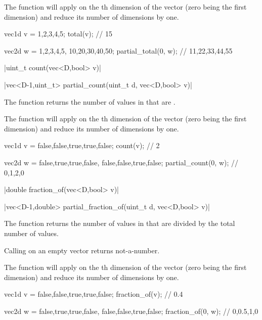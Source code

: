 The function  will apply  on the th dimension of the vector (zero being the first dimension) and reduce its number of dimensions by one.

\begin{example}
\begin{cppcode}
vec1d v = {1,2,3,4,5};
total(v); // 15

vec2d w = {{1,2,3,4,5}, {10,20,30,40,50}};
partial_total(0, w); // {11,22,33,44,55}
\end{cppcode}
\end{example}

\funcitem \cppinline|uint_t count(vec<D,bool> v)| 

\cppinline|vec<D-1,uint_t> partial_count(uint_t d, vec<D,bool> v)| 

The function  returns the number of values in  that are .

The function  will apply  on the th dimension of the vector (zero being the first dimension) and reduce its number of dimensions by one.

\begin{example}
\begin{cppcode}
vec1d v = {false,false,true,true,false};
count(v); // 2

vec2d w = {{false,true,true,false}, {false,false,true,false}};
partial_count(0, w); // {0,1,2,0}
\end{cppcode}
\end{example}

\funcitem \cppinline|double fraction_of(vec<D,bool> v)| 

\cppinline|vec<D-1,double> partial_fraction_of(uint_t d, vec<D,bool> v)| 

The function  returns the number of values in  that are  divided by the total number of values.

Calling  on an empty vector returns not-a-number.

The function  will apply  on the th dimension of the vector (zero being the first dimension) and reduce its number of dimensions by one.

\begin{example}
\begin{cppcode}
vec1d v = {false,false,true,true,false};
fraction_of(v); // 0.4

vec2d w = {{false,true,true,false}, {false,false,true,false}};
fraction_of(0, w); // {0,0.5,1,0}
\end{cppcode}
\end{example}

